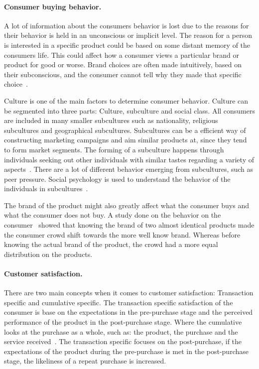 \paragraph{Consumer buying behavior.}
A lot of information about the consumers behavior is lost due to the reasons for their behavior is held in an unconscious or implicit level.
The reason for a person is interested in a specific product could be based on some distant memory of the consumers life.
This could affect how a consumer views a particular brand or product for good or worse.
Brand choices are often made intuitively, based on their subconscious, and the consumer cannot tell why they made that specific choice~\cite{vignali2009fashion}.

Culture is one of the main factors to determine consumer behavior.
Culture can be segmented into three parts: Culture, subculture and social class.
All consumers are included in many smaller subcultures such as nationality, religious subcultures and geographical subcultures.
Subcultures can be a efficient way of constructing marketing campaigns and aim similar products at, since they tend to form market segments.
The forming of a subculture happens through individuals seeking out other individuals with similar tastes regarding a variety of aspects~\cite{vignali2009fashion}.
There are a lot of different behavior emerging from subcultures, such as peer pressure.
Social psychology is used to understand the behavior of the individuals in subcultures~\cite{vignali2009fashion}.

The brand of the product might also greatly affect what the consumer buys and what the consumer does not buy.
A study done on the behavior on the consumer~\cite{deLace2011} showed that knowing the brand of two almost identical products made the consumer crowd shift towards the more well know brand.
Whereas before knowing the actual brand of the product, the crowd had a more equal distribution on the products.

\paragraph{Customer satisfaction.}
There are two main concepts when it comes to customer satisfaction:
Transaction specific and cumulative specific.
The transaction specific satisfaction of the consumer is base on the expectations in the pre-purchase stage and the perceived performance of the product in the post-purchase stage.
Where the cumulative looks at the purchase as a whole, such as: the product, the purchase and the service received~\cite{kumari2012}.
The transaction specific focuses on the post-purchase, if the expectations of the product during the pre-purchase is met in the post-purchase stage, the likeliness of a repeat purchase is increased.

